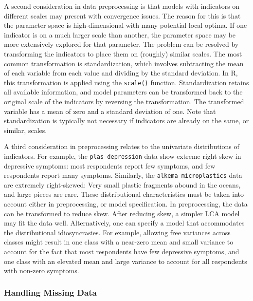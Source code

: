 \documentclass[
  ,man,floatsintext]{apa6}
\begin{document}
A second consideration in data preprocessing is that models with
indicators on different scales may present with convergence issues. The
reason for this is that the parameter space is high-dimensional with
many potential local optima. If one indicator is on a much larger scale
than another, the parameter space may be more extensively explored for
that parameter. The problem can be resolved by transforming the
indicators to place them on (roughly) similar scales. The most common
transformation is standardization, which involves subtracting the mean
of each variable from each value and dividing by the standard deviation.
In R, this transformation is applied using the \texttt{scale()} function.
Standardization retains all available information, and model parameters
can be transformed back to the original scale of the indicators by
reversing the transformation. The transformed variable has a mean of
zero and a standard deviation of one. Note that standardization is
typically not necessary if indicators are already on the same, or
similar, scales.

A third consideration in preprocessing relates to the univariate
distributions of indicators. For example, the \texttt{plas\_depression} data
show extreme right skew in depressive symptoms: most respondents report
few symptoms, and few respondents report many symptoms. Similarly, the
\texttt{alkema\_microplastics} data are extremely right-skewed: Very small
plastic fragments abound in the oceans, and large pieces are rare. These
distributional characteristics must be taken into account either in
preprocessing, or model specification. In preprocessing, the data can be
transformed to reduce skew. After reducing skew, a simpler LCA model may
fit the data well. Alternatively, one can specify a model that
accommodates the distributional idiosyncrasies. For example, allowing
free variances across classes might result in one class with a near-zero
mean and small variance to account for the fact that most respondents
have few depressive symptoms, and one class with an elevated mean and
large variance to account for all respondents with non-zero symptoms.

\hypertarget{handling-missing-data}{%
\subsubsection{Handling Missing Data}\label{handling-missing-data}}
\end{document}
